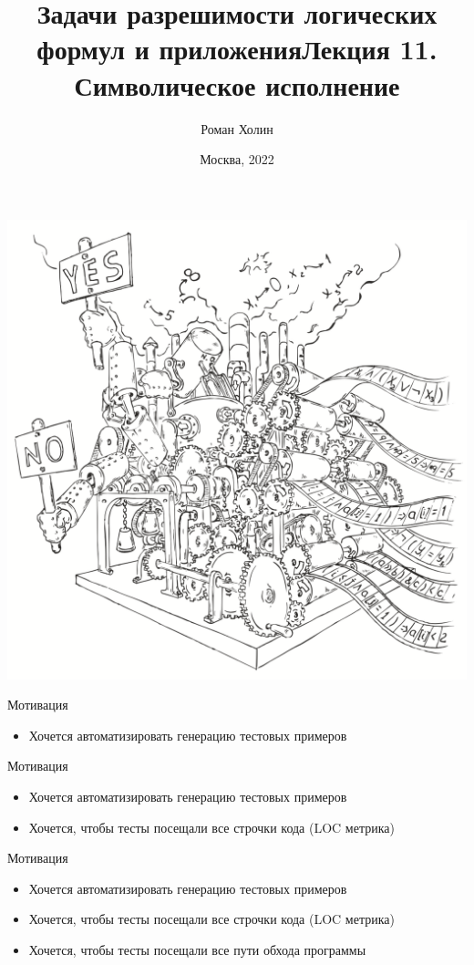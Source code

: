 \documentclass{beamer}
\begin{document}
\title{Задачи разрешимости логических формул и приложения\newline Лекция 11. Символическое исполнение}
\author{Роман Холин}
\date{Москва, 2022}

\begin{frame}
\includegraphics[scale=0.5]{../decision-procedure.png}
\end{frame}

\frame{\titlepage}

\begin{frame}{Мотивация}
\begin{itemize}
\item Хочется автоматизировать генерацию тестовых примеров
\end{itemize}
\end{frame}

\begin{frame}{Мотивация}
\begin{itemize}
\item Хочется автоматизировать генерацию тестовых примеров
\item Хочется, чтобы тесты посещали все строчки кода (LOC метрика)
\end{itemize}
\end{frame}

\begin{frame}{Мотивация}
\begin{itemize}
\item Хочется автоматизировать генерацию тестовых примеров
\item Хочется, чтобы тесты посещали все строчки кода (LOC метрика)
\item Хочется, чтобы тесты посещали все пути обхода программы
\end{itemize}
\end{frame}
\end{document}
